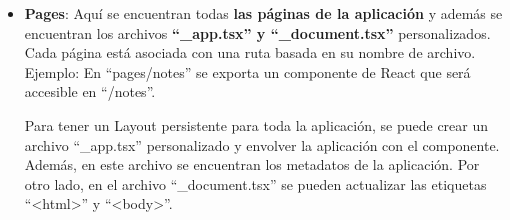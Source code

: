 \documentclass[12pt,twoside,titlepage]{report}
\begin{document}
\begin{itemize}
    \item \textbf{Pages}: Aquí se encuentran todas \textbf{las páginas de la aplicación} y además se encuentran los archivos \textbf{``\_app.tsx'' y ``\_document.tsx''} personalizados. Cada página está asociada con una ruta basada en su nombre de archivo. Ejemplo: En ``pages/notes'' se exporta un componente de React que será accesible en ``/notes''.
    
        Para tener un Layout persistente para toda la aplicación, se puede crear un archivo ``\_app.tsx'' personalizado y envolver la aplicación con el componente. Además, en este archivo se encuentran los metadatos de la aplicación. Por otro lado, en el archivo ``\_document.tsx'' se pueden actualizar las etiquetas ``<html>'' y ``<body>''.
    

\end{itemize}
\end{document}
